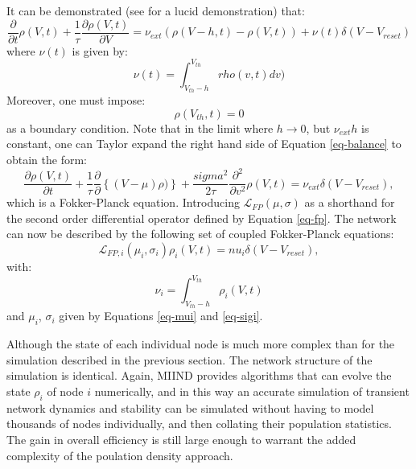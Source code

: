 \documentclass[12pt]{article}
\begin{document}
It can be demonstrated (see \citet{omurtag2000} for a lucid demonstration) that:
\begin{equation}
  \frac{\partial}{\partial t} \rho(V,t) + \frac{1}{\tau}\frac{\partial \rho(V,t)}{\partial V} = \nu_{ext}( \rho(V-h,t) - \rho(V,t)) +\nu(t) \delta(V -V_{reset})
  \label{eq-balance}
\end{equation}
where $\nu(t)$ is given by:
\begin{equation}
  \nu(t) = \int^{V_{th}}_{V_{th} - h} rho(v,t) dv)
\end{equation}
Moreover, one must impose:
\begin{equation}
  \rho(V_{th},t) = 0
\end{equation}
as a boundary condition. Note that in the limit where $h \rightarrow 0$, but $\nu_{ext} h $ is constant, one can Taylor expand the right hand side of
Equation \ref{eq-balance} to obtain the form:
\begin{equation}
\frac{\partial \rho(V,t)}{\partial t} + \frac{1}{\tau}\frac{\partial}{\partial}\left\{(V - \mu)\rho)\right\}  + \frac{sigma^2}{2 \tau}\frac{\partial^2}{\partial v^2} \rho(V,t) = \nu_{ext} \delta (V - V_{reset}),
\label{eq-fp}
\end{equation}
which is a Fokker-Planck equation.
Introducing $\mathcal{L}_{FP}(\mu, \sigma)$ as a shorthand for the second order differential operator defined by Equation \ref{eq-fp}.
The network can now be described by the following set of coupled Fokker-Planck equations:
\begin{equation}
  \mathcal{L}_{FP,i}(\mu_{i},\sigma_{i})\rho_i(V,t) = nu_{i} \delta(V - V_{reset}),
\end{equation}
with:
\begin{equation}
  \nu_i = \int^{V_{th}}_{V_{th}-h} \rho_i(V,t)
\end{equation}
and $\mu_i$, $\sigma_i$ given by Equations \ref{eq-mui} and \ref{eq-sigi}. 

Although the state of each individual node is much more complex than for the simulation described in the previous section. The network structure
of the simulation is identical. Again, MIIND provides algorithms that can evolve the state $\rho_i$ of node $i$ numerically, and in this way
an accurate simulation of transient network dynamics and stability can be simulated without having to model thousands of nodes individually, and then
collating their population statistics. The gain in overall efficiency is still large enough to warrant the added complexity of the poulation
density approach.
\end{document}
